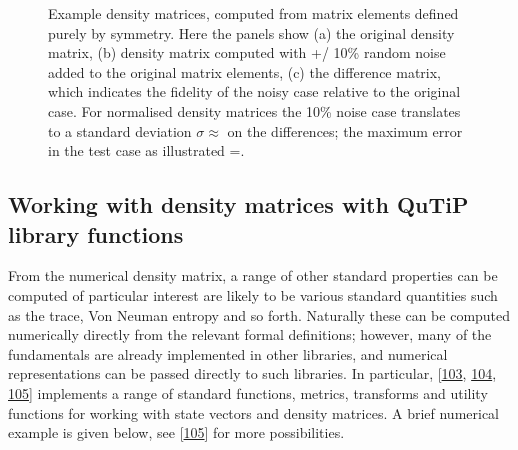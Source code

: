 \documentclass[letterpaper,table,10pt,english]{jupyterBook}
\begin{document}
\begin{figure}[htbp]
\centering
\capstart

\noindent{}
\caption{Example density matrices, computed from matrix elements defined purely by  symmetry. Here the panels show (a) the original density matrix, (b) density matrix computed with +/\sphinxhyphen{} 10\% random noise added to the original matrix elements, (c) the difference matrix, which indicates the fidelity of the noisy case relative to the original case. For normalised density matrices the 10\% noise case translates to a standard deviation \(\sigma\approx\) on the differences; the maximum error in the test case as illustrated =.}\label{\detokenize{part1/theory_density_matrices_190723:fig-denmatd2hcompexample}}\end{figure}


\subsection{Working with density matrices with QuTiP library functions}
\label{\detokenize{part1/theory_density_matrices_190723:working-with-density-matrices-with-qutip-library-functions}}\label{\detokenize{part1/theory_density_matrices_190723:sect-theory-denmat-qutip}}
\sphinxAtStartPar
From the numerical density matrix, a range of other standard properties can be computed \sphinxhyphen{} of particular interest are likely to be various standard quantities such as the trace, Von Neuman entropy and so forth. Naturally these can be computed numerically directly from the relevant formal definitions; however, many of the fundamentals are already implemented in other libraries, and numerical representations can be passed directly to such libraries. In particular,  {[}\hyperlink{cite.backmatter/bibliography:id705}{103}, \hyperlink{cite.backmatter/bibliography:id706}{104}, \hyperlink{cite.backmatter/bibliography:id831}{105}{]} implements a range of standard functions, metrics, transforms and utility functions for working with state vectors and density matrices. A brief numerical example is given below, see  {[}\hyperlink{cite.backmatter/bibliography:id831}{105}{]} for more possibilities.
\end{document}
